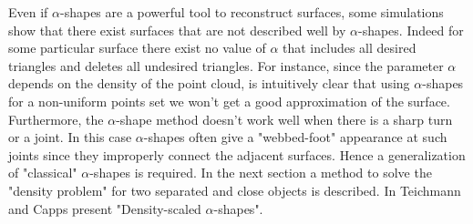 \indent Even if $\alpha$-shapes are a powerful tool to reconstruct surfaces, some simulations show that there exist surfaces that are not described well by $ \alpha $-shapes. Indeed for some particular surface there exist no value of $\alpha$ that includes all desired triangles and deletes all undesired triangles. For instance, since the parameter $\alpha$ depends on the density of the point cloud, is intuitively clear that using $\alpha$-shapes for a non-uniform points set we won't get a good approximation of the surface. Furthermore, the $\alpha$-shape method doesn't work well when there is a sharp turn or a joint. In this case $\alpha$-shapes often give a "webbed-foot" appearance at such joints since they improperly connect the adjacent surfaces. Hence a generalization of "classical" $\alpha$-shapes is required. In the next section a method to solve the "density problem" for two separated and close objects is described.
In \cite{teichmann1998surface} Teichmann and Capps present "Density-scaled $\alpha$-shapes".
